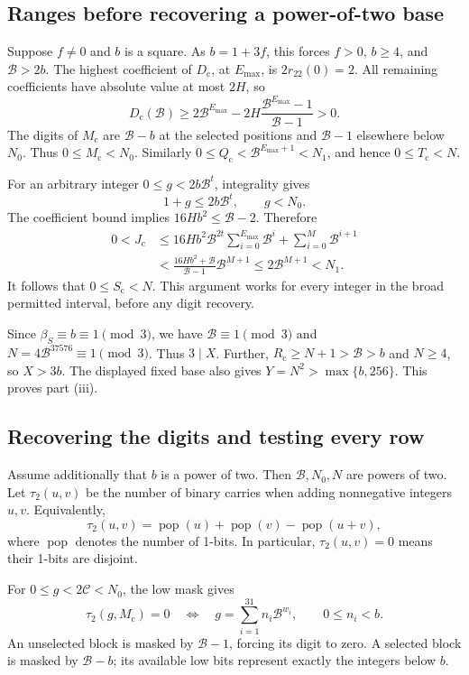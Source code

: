 \documentclass[11pt]{article}
\newcommand{\pc}{\operatorname{pop}}
\newcommand{\BB}{\mathcal B}
\newcommand{\capC}{\mathscr C}
\newcommand{\Dcode}{D_{\mathrm c}}
\theoremstyle{definition}
\theoremstyle{remark}
\numberwithin{equation}{section}
\begin{document}
\subsection{Ranges before recovering a power-of-two base}

Suppose \(f\ne0\) and \(b\) is a square. As \(b=1+3f\), this forces
\(f>0\), \(b\ge4\), and \(\BB>2b\).
The highest coefficient of \(\Dcode\), at \(E_{\max}\), is
\(2r_{22}(0)=2\). All remaining coefficients have absolute value at
most \(2H\), so
\[
 \Dcode(\BB)\ge
 2\BB^{E_{\max}}-
 2H\frac{\BB^{E_{\max}}-1}{\BB-1}>0.
\]
The digits of \(M_{\mathrm c}\) are \(\BB-b\) at the selected positions
and \(\BB-1\) elsewhere below \(N_0\). Thus \(0\le M_{\mathrm c}<N_0\).
Similarly \(0\le Q_{\mathrm c}<\BB^{E_{\max}+1}<N_1\), and hence
\(0\le T_{\mathrm c}<N\).

For an arbitrary integer \(0\le g<2b\BB^t\), integrality gives
\[
 1+g\le2b\BB^t,\qquad g<N_0.
\]
The coefficient bound implies \(16Hb^2\le\BB-2\). Therefore
\begin{align*}
0<J_{\mathrm c}
&\le16Hb^2\BB^{2t}\sum_{i=0}^{E_{\max}}\BB^i
                      +\sum_{i=0}^{M}\BB^{i+1}\\
&<\frac{16Hb^2+\BB}{\BB-1}\BB^{M+1}
\le2\BB^{M+1}<N_1 .
\end{align*}
It follows that \(0\le S_{\mathrm c}<N\). This argument works for every
integer in the broad permitted interval, before any digit recovery.

Since \(\beta_S\equiv b\equiv1\pmod3\), we have
\(\BB\equiv1\pmod3\) and \(N=4\BB^{37576}\equiv1\pmod3\).
Thus \(3\mid X\). Further,
\(R_{\mathrm c}\ge N+1>\BB>b\) and \(N\ge4\), so \(X>3b\).
The displayed fixed base also gives \(Y=N^2>\max\{b,256\}\).
This proves part (iii).

\subsection{Recovering the digits and testing every row}

Assume additionally that \(b\) is a power of two. Then
\(\BB,N_0,N\) are powers of two. Let \(\tau_2(u,v)\) be the number of
binary carries when adding nonnegative integers \(u,v\).
Equivalently,
\[
 \tau_2(u,v)=\pc(u)+\pc(v)-\pc(u+v),
\]
where \(\pc\) denotes the number of 1-bits.
In particular, \(\tau_2(u,v)=0\) means their 1-bits are disjoint.

For \(0\le g<2\capC<N_0\), the low mask gives
\begin{equation}\label{eq:digitmask}
 \tau_2(g,M_{\mathrm c})=0
 \quad\Longleftrightarrow\quad
 g=\sum_{i=1}^{31}n_i\BB^{w_i},\qquad 0\le n_i<b.
\end{equation}
An unselected block is masked by \(\BB-1\), forcing its digit to zero.
A selected block is masked by \(\BB-b\); its available low bits represent
exactly the integers below \(b\).
\end{document}
